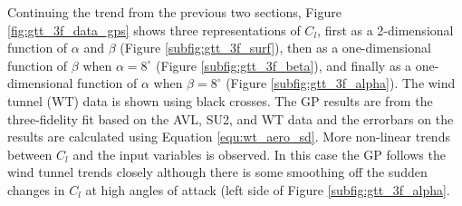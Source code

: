 Continuing the trend from the previous two sections, Figure \ref{fig:gtt_3f_data_gps} shows three representations of $C_l$, first as a 2-dimensional function of $\alpha$ and $\beta$ (Figure \ref{subfig:gtt_3f_surf}), then as a one-dimensional function of $\beta$ when $\alpha=8^\circ$ (Figure \ref{subfig:gtt_3f_beta}), and finally as a one-dimensional function of $\alpha$ when $\beta = 8^\circ$ (Figure \ref{subfig:gtt_3f_alpha}).
The wind tunnel (WT) data is shown using black crosses.
The GP results are from the three-fidelity fit based on the AVL, SU2, and WT data and the errorbars on the results are calculated using Equation \ref{equ:wt_aero_sd}.
More non-linear trends between $C_l$ and the input variables is observed.
In this case the GP follows the wind tunnel trends closely although there is some smoothing off the sudden changes in $C_l$ at high angles of attack (left side of Figure \ref{subfig:gtt_3f_alpha}.

